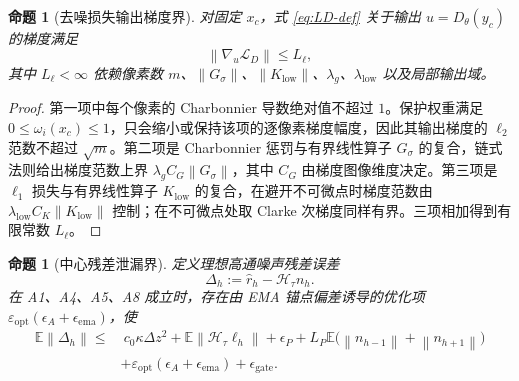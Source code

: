 \documentclass[11pt,a4paper,UTF8,fontset=fandol]{ctexart}
\newtheorem{proposition}[theorem]{命题}
\theoremstyle{definition}
\newcommand{\norm}[1]{\left\lVert#1\right\rVert}
\newcommand{\E}{\mathbb{E}}
\newcommand{\cL}{\mathcal{L}}
\newcommand{\cH}{\mathcal{H}}
\begin{document}
\begin{proposition}[去噪损失输出梯度界]
\label{prop:loss-gradient}
对固定 $x_c$，式 \eqref{eq:LD-def} 关于输出 $u=D_\theta(y_c)$ 的梯度满足
\begin{equation}
\label{eq:loss-gradient-bound}
    \norm{\nabla_u\cL_D}\le L_\ell,
\end{equation}
其中 $L_\ell<\infty$ 依赖像素数 $m$、$\norm{G_\sigma}$、$\norm{K_{\mathrm{low}}}$、$\lambda_g$、$\lambda_{\mathrm{low}}$ 以及局部输出域。
\end{proposition}

\begin{proof}
第一项中每个像素的 Charbonnier 导数绝对值不超过 $1$。保护权重满足 $0\le\omega_i(x_c)\le1$，只会缩小或保持该项的逐像素梯度幅度，因此其输出梯度的 $\ell_2$ 范数不超过 $\sqrt m$。第二项是 Charbonnier 惩罚与有界线性算子 $G_\sigma$ 的复合，链式法则给出梯度范数上界 $\lambda_g C_G\norm{G_\sigma}$，其中 $C_G$ 由梯度图像维度决定。第三项是 $\ell_1$ 损失与有界线性算子 $K_{\mathrm{low}}$ 的复合，在避开不可微点时梯度范数由 $\lambda_{\mathrm{low}} C_K\norm{K_{\mathrm{low}}}$ 控制；在不可微点处取 Clarke 次梯度同样有界。三项相加得到有限常数 $L_\ell$。
\end{proof}

\begin{proposition}[中心残差泄漏界]
\label{prop:residual-leakage}
定义理想高通噪声残差误差
\begin{equation}
\label{eq:leakage-def}
    \Delta_h:=\hat r_h-\cH_\tau n_h.
\end{equation}
在 A1、A4、A5、A8 成立时，存在由 EMA 锚点偏差诱导的优化项 $\varepsilon_{\mathrm{opt}}(\epsilon_A+\epsilon_{\mathrm{ema}})$，使
\begin{equation}
\label{eq:leakage-bound}
\begin{aligned}
    \E\norm{\Delta_h}
    \le&\ c_0\kappa\Delta z^2
    +\E\norm{\cH_\tau\ell_h}
    +\epsilon_P
    +L_P\E\big(\norm{n_{h-1}}+\norm{n_{h+1}}\big)\\
    &+\varepsilon_{\mathrm{opt}}(\epsilon_A+\epsilon_{\mathrm{ema}})
    +\epsilon_{\mathrm{gate}}.
\end{aligned}
\end{equation}
\end{proposition}
\end{document}
